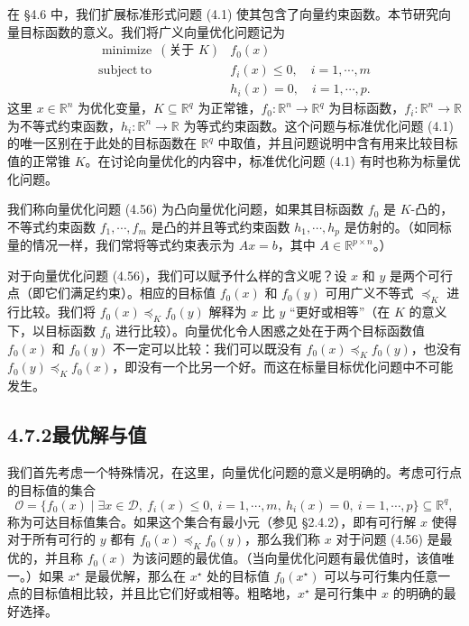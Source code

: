 \documentclass[UTF8,12pt,a4paper,fontset=fandol]{ctexart}
\begin{document}
在 \S 4.6 中，我们扩展标准形式问题 (4.1) 使其包含了向量约束函数。本节研究向量目标函数的意义。我们将广义向量优化问题记为
\begin{equation}
\begin{array}{ll}
\mathop{\mathrm{minimize}}\ (\text{关于 }K) & f_0(x)\\
\mathrm{subject\ to} & f_i(x)\leq 0,\quad i=1,\cdots,m\\
& h_i(x)=0,\quad i=1,\cdots,p.
\end{array}
\tag{4.56}
\end{equation}
这里 $x\in\mathbb{R}^n$ 为优化变量，$K\subseteq\mathbb{R}^q$ 为正常锥，$f_0:\mathbb{R}^n\to\mathbb{R}^q$ 为目标函数，$f_i:\mathbb{R}^n\to\mathbb{R}$ 为不等式约束函数，$h_i:\mathbb{R}^n\to\mathbb{R}$ 为等式约束函数。这个问题与标准优化问题 (4.1) 的唯一区别在于此处的目标函数在 $\mathbb{R}^q$ 中取值，并且问题说明中含有用来比较目标值的正常锥 $K$。在讨论向量优化的内容中，标准优化问题 (4.1) 有时也称为标量优化问题。

我们称向量优化问题 (4.56) 为凸向量优化问题，如果其目标函数 $f_0$ 是 $K$-凸的，不等式约束函数 $f_1,\cdots,f_m$ 是凸的并且等式约束函数 $h_1,\cdots,h_p$ 是仿射的。（如同标量的情况一样，我们常将等式约束表示为 $Ax=b$，其中 $A\in\mathbb{R}^{p\times n}$。）

对于向量优化问题 (4.56)，我们可以赋予什么样的含义呢？设 $x$ 和 $y$ 是两个可行点（即它们满足约束）。相应的目标值 $f_0(x)$ 和 $f_0(y)$ 可用广义不等式 $\preceq_K$ 进行比较。我们将 $f_0(x)\preceq_K f_0(y)$ 解释为 $x$ 比 $y$ “更好或相等”（在 $K$ 的意义下，以目标函数 $f_0$ 进行比较）。向量优化令人困惑之处在于两个目标函数值 $f_0(x)$ 和 $f_0(y)$ 不一定可以比较：我们可以既没有 $f_0(x)\preceq_K f_0(y)$，也没有 $f_0(y)\preceq_K f_0(x)$，即没有一个比另一个好。而这在标量目标优化问题中不可能发生。

\subsection*{4.7.2\quad 最优解与值}

我们首先考虑一个特殊情况，在这里，向量优化问题的意义是明确的。考虑可行点的目标值的集合
\[
\mathcal{O}=\{f_0(x)\mid \exists x\in\mathcal{D},\ f_i(x)\leq 0,\ i=1,\cdots,m,\ h_i(x)=0,\ i=1,\cdots,p\}\subseteq\mathbb{R}^q,
\]
称为可达目标值集合。如果这个集合有最小元（参见 \S 2.4.2），即有可行解 $x$ 使得对于所有可行的 $y$ 都有 $f_0(x)\preceq_K f_0(y)$，那么我们称 $x$ 对于问题 (4.56) 是最优的，并且称 $f_0(x)$ 为该问题的最优值。（当向量优化问题有最优值时，该值唯一。）如果 $x^\star$ 是最优解，那么在 $x^\star$ 处的目标值 $f_0(x^\star)$ 可以与可行集内任意一点的目标值相比较，并且比它们好或相等。粗略地，$x^\star$ 是可行集中 $x$ 的明确的最好选择。
\end{document}
